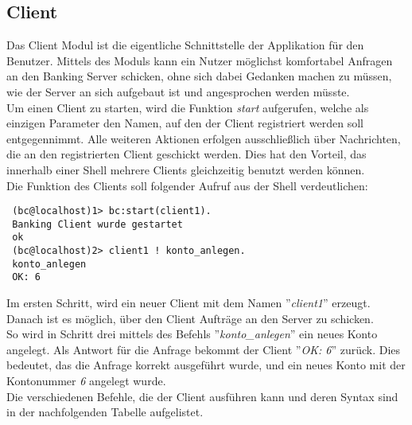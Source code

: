 \newpage
\subsection{Client}
Das Client Modul ist die eigentliche Schnittstelle der Applikation für den Benutzer. Mittels des Moduls kann ein Nutzer möglichst komfortabel Anfragen an den Banking Server schicken, ohne sich dabei Gedanken machen zu müssen, wie der Server an sich aufgebaut ist und angesprochen werden müsste.\\
Um einen Client zu starten, wird die Funktion \textit{start} aufgerufen, welche als einzigen Parameter den Namen, auf den der Client registriert werden soll entgegennimmt. Alle weiteren Aktionen erfolgen ausschließlich über Nachrichten, die an den registrierten Client geschickt werden. Dies hat den Vorteil, das innerhalb einer Shell mehrere Clients gleichzeitig benutzt werden können.\\
Die Funktion des Clients soll folgender Aufruf aus der Shell verdeutlichen:
\begin{lstlisting} 
 (bc@localhost)1> bc:start(client1).
 Banking Client wurde gestartet
 ok
 (bc@localhost)2> client1 ! konto_anlegen.
 konto_anlegen
 OK: 6
\end{lstlisting}
Im ersten Schritt, wird ein neuer Client mit dem Namen ''\textit{client1}'' erzeugt. Danach ist es möglich, über den Client Aufträge an den Server zu schicken.\\ 
So wird in Schritt drei mittels des Befehls ''\textit{konto\_anlegen}'' ein neues Konto angelegt. Als Antwort für die Anfrage bekommt der Client ''\textit{OK: 6}'' zurück. Dies bedeutet, das die Anfrage korrekt ausgeführt wurde, und ein neues Konto mit der Kontonummer \textit{6} angelegt wurde.\\
Die verschiedenen Befehle, die der Client ausführen kann und deren Syntax sind in der nachfolgenden Tabelle aufgelistet.\\
